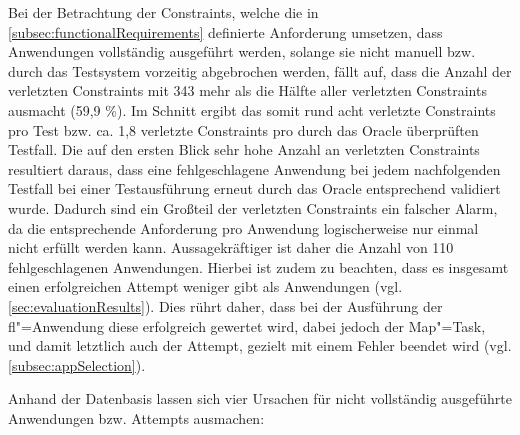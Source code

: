 Bei der Betrachtung der Constraints, welche die in \cref{subsec:functionalRequirements} definierte Anforderung umsetzen, dass Anwendungen vollständig ausgeführt werden, solange sie nicht manuell bzw. durch das Testsystem vorzeitig abgebrochen werden, fällt auf, dass die Anzahl der verletzten Constraints mit 343 mehr als die Hälfte aller verletzten Constraints ausmacht (59,9 \%).
Im Schnitt ergibt das somit rund acht verletzte Constraints pro Test bzw. ca. 1,8 verletzte Constraints pro durch das Oracle überprüften Testfall.
Die auf den ersten Blick sehr hohe Anzahl an verletzten Constraints resultiert daraus, dass eine fehlgeschlagene Anwendung bei jedem nachfolgenden Testfall bei einer Testausführung erneut durch das Oracle entsprechend validiert wurde.
Dadurch sind ein Großteil der verletzten Constraints ein falscher Alarm, da die entsprechende Anforderung pro Anwendung logischerweise nur einmal nicht erfüllt werden kann.
Aussagekräftiger ist daher die Anzahl von 110 fehlgeschlagenen Anwendungen.
Hierbei ist zudem zu beachten, dass es insgesamt einen erfolgreichen Attempt weniger gibt als Anwendungen (vgl. \cref{sec:evaluationResults}).
Dies rührt daher, dass bei der Ausführung der \acrlong{fl}"=Anwendung diese erfolgreich gewertet wird, dabei jedoch der Map"=Task, und damit letztlich auch der Attempt, gezielt mit einem Fehler beendet wird (vgl. \cref{subsec:appSelection}).

Anhand der Datenbasis lassen sich vier Ursachen für nicht vollständig ausgeführte Anwendungen bzw. Attempts ausmachen:

